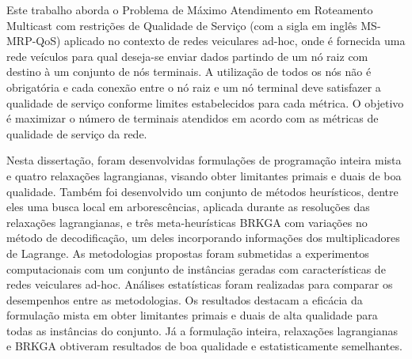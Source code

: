 \documentclass[Portugues]{ic-tese-v3}
\theoremstyle{definition}
\theoremstyle{proposition}
\begin{document}


\begin{resumo}

Este trabalho  aborda o Problema  de Máximo Atendimento em  Roteamento Multicast
com  restrições de  Qualidade  de Serviço  (com a  sigla  em inglês  MS-MRP-QoS)
aplicado  no contexto  de redes  veiculares ad-hoc,  onde é  fornecida uma  rede
veículos para qual deseja-se  enviar dados partindo de um nó  raiz com destino à
um conjunto de nós  terminais. A utilização de todos os nós  não é obrigatória e
cada conexão  entre o nó raiz  e um nó  terminal deve satisfazer a  qualidade de
serviço conforme limites estabelecidos para cada métrica. O objetivo é maximizar
o  número de  terminais atendidos  em  acordo com  as métricas  de qualidade  de
serviço da rede.

Nesta dissertação, foram desenvolvidas  formulações de programação inteira mista
e quatro  relaxações lagrangianas, visando  obter limitantes primais e  duais de
boa  qualidade. Também  foi  desenvolvido um  conjunto  de métodos  heurísticos,
dentre eles  uma busca local  em arborescências, aplicada durante  as resoluções
das  relaxações lagrangianas,  e três  meta-heurísticas BRKGA  com variações  no
método de  decodificação, um deles incorporando  informações dos multiplicadores
de  Lagrange.   As  metodologias  propostas  foram   submetidas  a  experimentos
computacionais  com um  conjunto de  instâncias geradas  com características  de
redes veiculares ad-hoc. Análises estatísticas foram realizadas para comparar os
desempenhos  entre  as  metodologias.  Os  resultados  destacam  a  eficácia  da
formulação mista  em obter  limitantes primais  e duais  de alta  qualidade para
todas  as   instâncias  do  conjunto.   Já  a  formulação   inteira,  relaxações
lagrangianas e  BRKGA obtiveram resultados  de boa qualidade  e estatisticamente
semelhantes.

  


\end{resumo}
\end{document}
